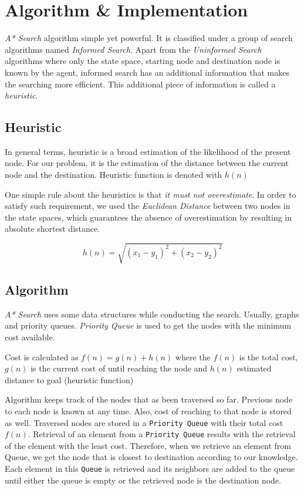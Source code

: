 \documentclass{IEEEtran}
\begin{document}
	
	\section{Algorithm \& Implementation}
	\textit{A* Search} algorithm simple yet powerful. It is classified under a group of search algorithms named \textit{Informed Search}. Apart from the \textit{Uninformed Search} algorithms where only the state space, starting node and destination node is known by the agent, informed search has an additional information that makes the searching more efficient. This additional piece of information is called a \textit{heuristic}. \cite{astar}
	
	\subsection{Heuristic}
	In general terms, heuristic is a broad estimation of the likelihood of the present node. For our problem, it is the estimation of the distance between the current node and the destination. Heuristic function is denoted with $h(n)$
	
	One simple rule about the heuristics is that \emph{it must not overestimate}. In order to satisfy such requirement, we used the \emph{Euclidean Distance} between two nodes in the state spaces, which guarantees the absence of overestimation by resulting in absolute shortest distance. \newline \par
	
	\begin{equation}
		h(n) = \sqrt{(x_1 - y_1)^2 + (x_2 - y_2)^2 }
	\end{equation}
	
	\subsection{Algorithm}
	\textit{A* Search} uses some data structures while conducting the search. Usually, graphs and priority queues. \textit{Priority Queue} is used to get the nodes with the minimum cost available.
	
	Cost is calculated as $f(n) = g(n) + h(n)$ where the $f(n)$ is the total cost, $g(n)$ is the current cost of until reaching the node and $h(n)$ estimated distance to goal (heuristic function) \newline \par
	
	Algorithm keeps track of the nodes that as been traversed so far. Previous node to each node is known at any time. Also, cost of reaching to that node is stored as well. Traversed nodes are stored in a \texttt{Priority Queue} with their total cost $f(n)$. Retrieval of an element from a \texttt{Priority Queue} results with the retrieval of the element with the least cost. Therefore, when we retrieve an element from Queue, we get the node that is closest to destination according to our knowledge. Each element in this \texttt{Queue} is retrieved and its neighbors are added to the queue until either the queue is empty or the retrieved node is the destination node.
	
\end{document}
